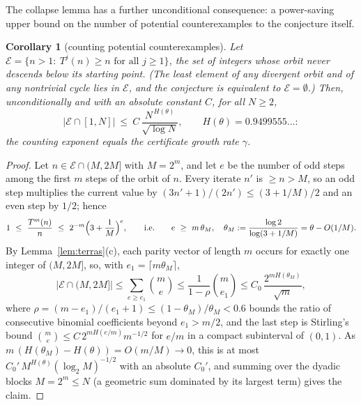 \documentclass[11pt]{article}
\newtheorem{corollary}[theorem]{Corollary}
\theoremstyle{definition}
\newcommand{\ceil}[1]{\lceil #1\rceil}
\begin{document}
The collapse lemma has a further unconditional consequence: a power-saving
upper bound on the number of potential counterexamples to the conjecture
itself.

\begin{corollary}[counting potential counterexamples]\label{cor:count}
Let $\mathcal{E}=\{n>1:\ T^j(n)\ge n \text{ for all } j\ge 1\}$, the set of
integers whose orbit never descends below its starting point. (The least
element of any divergent orbit and of any nontrivial cycle lies in
$\mathcal{E}$, and the conjecture is equivalent to
$\mathcal{E}=\emptyset$.) Then, unconditionally and with an absolute constant $C$,
for all $N\ge 2$,
\[
|\mathcal{E}\cap[1,N]|\ \le\ C\,\frac{N^{\,H(\theta)}}{\sqrt{\log N}},\qquad
H(\theta)=0.9499555\ldots :
\]
the counting exponent equals the certificate growth rate $\gamma$.
\end{corollary}

\begin{proof}
Let $n\in\mathcal{E}\cap(M,2M]$ with $M=2^m$, and let $e$ be the number
of odd steps among the first $m$ steps of the orbit of $n$. Every iterate
$n'$ is $\ge n>M$, so an odd step multiplies the current value by
$(3n'+1)/(2n')\le (3+1/M)/2$ and an even step by $1/2$; hence
\[
1\ \le\ \frac{T^m(n)}{n}\ \le\ 2^{-m}\Bigl(3+\frac1M\Bigr)^{e},
\qquad\text{i.e.}\qquad e\ \ge\ m\,\theta_M,\quad
\theta_M:=\frac{\log 2}{\log(3+1/M)}=\theta-O(1/M).
\]
By Lemma~\ref{lem:terras}(c), each parity vector of length $m$ occurs
for exactly one integer of $(M,2M]$, so, with $e_1=\ceil{m\theta_M}$,
\[
|\mathcal{E}\cap(M,2M]|\le\sum_{e\ge e_1}\binom{m}{e}
\le\frac{1}{1-\rho}\binom{m}{e_1}\le C_0\,\frac{2^{mH(\theta_M)}}{\sqrt m},
\]
where $\rho=(m-e_1)/(e_1+1)\le(1-\theta_M)/\theta_M<0.6$ bounds the ratio of
consecutive binomial coefficients beyond $e_1>m/2$, and the last step is
Stirling's bound $\binom{m}{e}\le C\,2^{mH(e/m)}m^{-1/2}$ for
$e/m$ in a compact subinterval of $(0,1)$. As
$m\,(H(\theta_M)-H(\theta))=O(m/M)\to 0$, this is at most
$C_0'\,M^{H(\theta)}(\log_2 M)^{-1/2}$ with an absolute $C_0'$, and summing
over the dyadic blocks $M=2^m\le N$ (a geometric sum dominated by its
largest term) gives the claim.
\end{proof}
\end{document}
